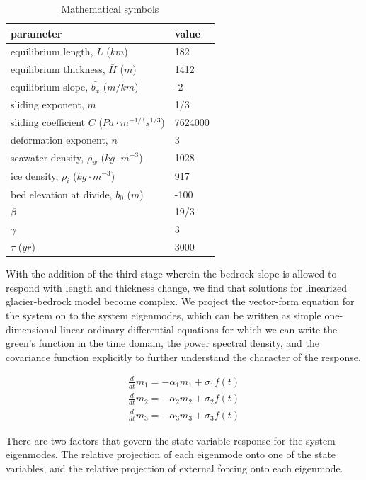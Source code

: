 \documentclass[tc, manuscript]{copernicus}
\begin{document}
\begin{table}[h]
    \begin{tabular}{l|l}
        \hline
        \bf{parameter} & \bf{value} \\
        \hline
        equilibrium length, $\bar{L}$ ($km$) &  182 \\
        equilibrium thickness, $\bar{H}$ ($m$) & 1412 \\
        equilibrium slope, $\bar{b_x}$ ($m/km$) &  -2  \\
        sliding exponent, $m$ & 1/3 \\
        sliding coefficient $C$ ($Pa\cdot m^{-1/3}s^{1/3}$) & 7624000 \\
        deformation exponent, $n$ & 3 \\
        seawater density, $\rho_w$ ($kg \cdot m^{-3}$)  & 1028 \\
        ice density, $\rho_i$ ($kg \cdot m^{-3}$) & 917 \\
        bed elevation at divide, $b_0$ ($m$) & -100 \\
        $\beta$ & 19/3 \\
        $\gamma$ & 3 \\
        $\tau$ ($yr$) & 3000\\
    \end{tabular}
    \caption{Mathematical symbols}
\end{table}

With the addition of the third-stage wherein the bedrock slope is allowed to respond with length and thickness change, we find that solutions for linearized glacier-bedrock model become complex. We project the vector-form equation for the system on to the system eigenmodes, which can be written as simple one-dimensional linear ordinary differential equations for which we can write the green's function in the time domain, the power spectral density, and the covariance function explicitly to further understand the character of the response. 

\begin{align}
\frac{d}{dt} m_1 = -\alpha_1 m_1 + \sigma_1 f(t)\\
\frac{d}{dt} m_2 = -\alpha_2 m_2 + \sigma_2 f(t)\\
\frac{d}{dt} m_3 = -\alpha_3 m_3 + \sigma_3 f(t)
\end{align}

There are two factors that govern the state variable response for the system eigenmodes. The relative projection of each eigenmode onto one of the state variables, and the relative projection of external forcing onto each eigenmode.
\end{document}
